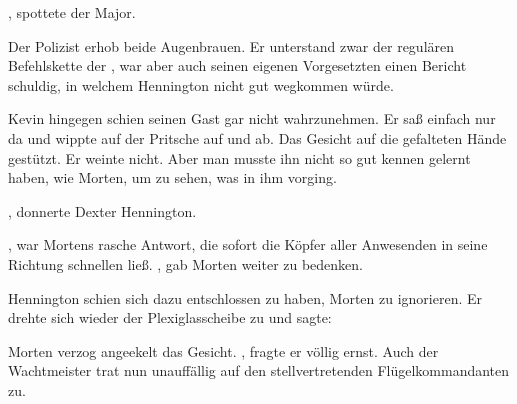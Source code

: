 \par

, spottete der Major.

\par

Der Polizist erhob beide Augenbrauen. Er unterstand zwar der regulären Befehlskette der , war aber auch seinen eigenen Vorgesetzten einen Bericht schuldig, in welchem Hennington nicht gut wegkommen würde.

\par

Kevin hingegen schien seinen Gast gar nicht wahrzunehmen. Er saß einfach nur da und wippte auf der Pritsche auf und ab. Das Gesicht auf die gefalteten Hände gestützt. Er weinte nicht. Aber man musste ihn nicht so gut kennen gelernt haben, wie Morten, um zu sehen, was in ihm vorging.

\par

, donnerte Dexter Hennington.

\par

, war Mortens rasche Antwort, die sofort die Köpfer aller Anwesenden in seine Richtung schnellen ließ. , gab Morten weiter zu bedenken. 

\par

Hennington schien sich dazu entschlossen zu haben, Morten zu ignorieren.
Er drehte sich wieder der Plexiglasscheibe zu und sagte: 

\par

Morten verzog angeekelt das Gesicht. , fragte er völlig ernst.  Auch der Wachtmeister trat nun unauffällig auf den stellvertretenden Flügelkommandanten zu.

